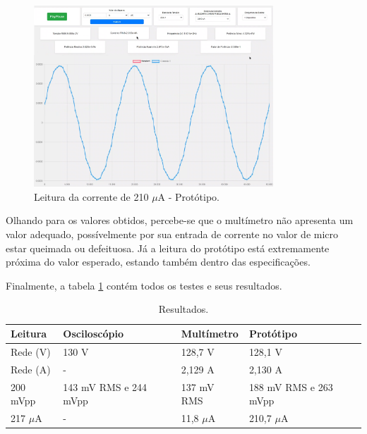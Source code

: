 \begin{figure}[htb!]
    \caption{Leitura da corrente de 210 $\mu$A - Protótipo.}
    \label{fig:leitura-micro-boy-onda}
    \includegraphics[width=0.8\textwidth]{figuras/leitura-micro-boy-onda.png}
    \fonte{}
\end{figure}


Olhando para os valores obtidos, percebe-se que o multímetro não apresenta um valor adequado, possívelmente por sua entrada de corrente no valor de micro estar queimada ou defeituosa. Já a leitura do protótipo está extremamente próxima do valor esperado, estando também dentro das especificações.

Finalmente, a tabela \ref{tab:resultados} contém todos os testes e seus resultados.

\begin{table}[!ht]
    \centering
    \caption{Resultados.}
    \label{tab:resultados}
    \begin{tabular}{|l|l|l|l|}
        \hline
        \textbf{Leitura} & \textbf{Osciloscópio} & \textbf{Multímetro} & \textbf{Protótipo}    \\ \hline
        Rede (V)         & 130 V                 & 128,7 V             & 128,1 V               \\ \hline
        Rede (A)         & -                     & 2,129 A             & 2,130 A               \\ \hline
        200 mVpp         & 143 mV RMS e 244 mVpp & 137 mV RMS          & 188 mV RMS e 263 mVpp \\ \hline
        217 $\mu$A       & -                     & 11,8 $\mu$A         & 210,7 $\mu$A          \\ \hline
    \end{tabular}
\end{table}
